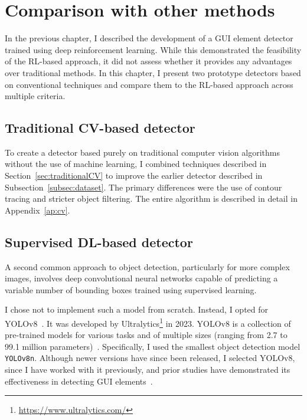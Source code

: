 \documentclass[
  digital,     %
  oneside,     %
  nosansbold,  %
  nocolorbold, %
  lof,         %
  lot,         %
]{fithesis4}
\begin{document}
\chapter{Comparison with other methods}
\label{ch:comparisons}

In the previous chapter, I described the development of a GUI element detector trained using deep reinforcement learning. While this demonstrated the feasibility of the RL-based approach, it did not assess whether it provides any advantages over traditional methods. In this chapter, I present two prototype detectors based on conventional techniques and compare them to the RL-based approach across multiple criteria.

\section{Traditional CV-based detector}
\label{sec:trad_cv_detector}

To create a detector based purely on traditional computer vision algorithms without the use of machine learning, I combined techniques described in Section~\ref{sec:traditionalCV} to improve the earlier detector described in Subsection~\ref{subsec:dataset}. The primary differences were the use of contour tracing and stricter object filtering. The entire algorithm is described in detail in Appendix~\ref{ap:cv}.

\section{Supervised DL-based detector}

A second common approach to object detection, particularly for more complex images, involves deep convolutional neural networks capable of predicting a variable number of bounding boxes trained using supervised learning.

I chose not to implement such a model from scratch. Instead, I opted for YOLOv8~\cite{yolov8_ultralytics}. It was developed by Ultralytics\footnote{\url{https://www.ultralytics.com/}} in 2023. YOLOv8 is a collection of pre-trained models for various tasks and of multiple sizes (ranging from 2.7 to 99.1 million parameters)~\cite{ultralytics-docs}. Specifically, I used the smallest object detection model \texttt{YOLOv8n}. Although newer versions have since been released, I selected YOLOv8, since I have worked with it previously, and prior studies have demonstrated its effectiveness in detecting GUI elements~\cite{GUI_YOLO_comparison}.
\end{document}
